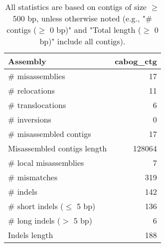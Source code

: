 \documentclass[12pt,a4paper]{article}
\begin{document}
\begin{table}[ht]
\begin{center}
\caption{All statistics are based on contigs of size $\geq$ 500 bp, unless otherwise noted (e.g., "\# contigs ($\geq$ 0 bp)" and "Total length ($\geq$ 0 bp)" include all contigs).}
\begin{tabular}{|l*{1}{|r}|}
\hline
Assembly & cabog\_ctg \\ \hline
\# misassemblies & 17 \\ \hline
\hspace{5mm}\# relocations & 11 \\ \hline
\hspace{5mm}\# translocations & 6 \\ \hline
\hspace{5mm}\# inversions & 0 \\ \hline
\# misassembled contigs & 17 \\ \hline
Misassembled contigs length & 128064 \\ \hline
\# local misassemblies & 7 \\ \hline
\# mismatches & 319 \\ \hline
\# indels & 142 \\ \hline
\hspace{5mm}\# short indels ($\leq$ 5 bp) & 136 \\ \hline
\hspace{5mm}\# long indels ($>$ 5 bp) & 6 \\ \hline
Indels length & 188 \\ \hline
\end{tabular}
\end{center}
\end{table}
\end{document}
